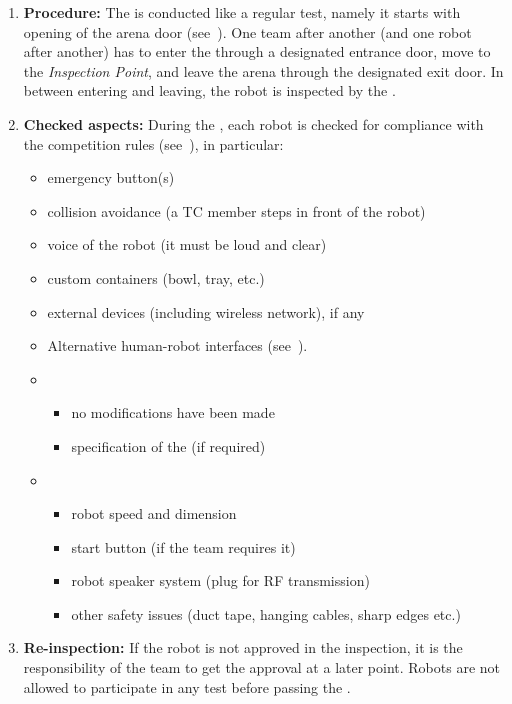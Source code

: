 \begin{enumerate}
	\item \textbf{Procedure:} The \RobotInspection{} is conducted like a regular test, namely it starts with opening of the arena door (see~). One team after another (and one robot after another) has to enter the \Arena{} through a designated entrance door, move to the \textit{Inspection Point}, and leave the arena through the designated exit door. In between entering and leaving, the robot is inspected by the \TC.
	\item \textbf{Checked aspects:} During the \RobotInspection{}, each robot is checked for compliance with the competition rules (see~), in particular:
	\begin{itemize}
		\item emergency button(s)
		\item collision avoidance (a TC member steps in front of the robot)
		\item voice of the robot (it must be loud and clear)
		\item custom containers (bowl, tray, etc.)
		\item external devices (including wireless network), if any
		\item Alternative human-robot interfaces (see~).
		\item {}
		\begin{itemize}
			\item no modifications have been made
			\item specification of the  (if required)
		\end{itemize}
		\item {}
		\begin{itemize}
			\item robot speed and dimension
			\item start button (if the team requires it)
			\item robot speaker system (plug for RF transmission)
			\item other safety issues (duct tape, hanging cables, sharp edges etc.)
		\end{itemize}
	\end{itemize}
	\item \textbf{Re-inspection:} If the robot is not approved in the inspection, it is the responsibility of the team to get the approval at a later point. Robots are not allowed to participate in any test before passing the \RobotInspection.

\end{enumerate}

